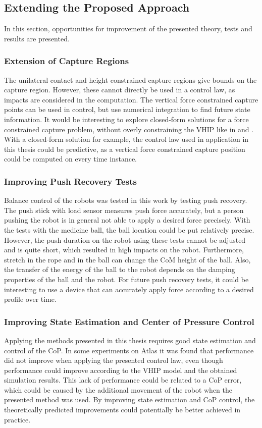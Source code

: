 \subsection{Extending the Proposed Approach }
In this section, opportunities for improvement of the presented theory, tests and results are presented.
\subsubsection{Extension of Capture Regions}
The unilateral contact and height constrained capture regions give bounds on the capture region. However, these cannot directly be used in a control law, as impacts are considered in the computation. The vertical force constrained capture points can be used in control, but use numerical integration to find future state information. It would be interesting to explore closed-form solutions for a force constrained capture problem, without overly constraining the \ac{VHIP} like in \cite{pratt2007derivation} and \cite{koolen2016balance}. With a closed-form solution for example, the control law used in application in this thesis could be predictive, as a vertical force constrained capture position could be computed on every time instance.
\subsubsection{Improving Push Recovery Tests}
Balance control of the robots was tested in this work by testing push recovery. The push stick with load sensor \cite{iload} measures push force accurately, but a person pushing the robot is in general not able to apply a desired force precisely. With the tests with the medicine ball, the ball location could be put relatively precise. However, the push duration on the robot using these tests cannot be adjusted and is quite short, which resulted in high impacts on the robot. Furthermore, stretch in the rope and in the ball can change the \ac{CoM} height of the ball. Also, the transfer of the energy of the ball to the robot depends on the damping properties of the ball and the robot. For future push recovery tests, it could be interesting to use a device that can accurately apply force according to a desired profile over time.
\subsubsection{Improving State Estimation and Center of Pressure Control}
Applying the methods presented in this thesis requires good state estimation and control of the \ac{CoP}. In some experiments on Atlas it was found that performance did not improve when applying the presented control law, even though performance could improve according to the \ac{VHIP} model and the obtained simulation results. This lack of performance could be related to a \ac{CoP} error, which could be caused by the additional movement of the robot when the presented method was used. By improving state estimation and \ac{CoP} control, the theoretically predicted improvements could potentially be better achieved in practice.
